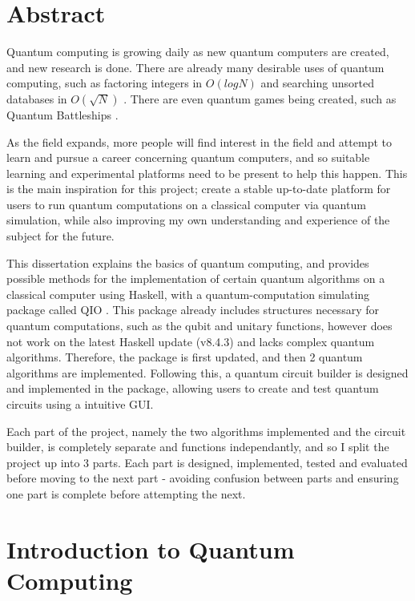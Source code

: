 \documentclass[a4paper,11pt, titlepage, twoside]{article}
\begin{document}
\section*{Abstract}
Quantum computing is growing daily as new quantum computers are created, and new research is done. There are already many desirable uses of quantum computing, such as factoring integers in $O(log N)$ \cite{shor} and searching unsorted databases in $O(\sqrt{N})$ \cite{grover}. There are even quantum games being created, such as Quantum Battleships \cite{qships}. \par
As the field expands, more people will find interest in the field and attempt to learn and pursue a career concerning quantum computers, and so suitable learning and experimental platforms need to be present to help this happen. This is the main inspiration for this project; create a stable up-to-date platform for users to run quantum computations on a classical computer via quantum simulation, while also improving my own understanding and experience of the subject for the future.\par
This dissertation explains the basics of quantum computing, and provides possible methods for the implementation of certain quantum algorithms on a classical computer using Haskell, with a quantum-computation simulating package called QIO \cite{qio}. This package already includes structures necessary for quantum computations, such as the qubit and unitary functions, however does not work on the latest Haskell update (v8.4.3) and lacks complex quantum algorithms. Therefore, the package is first updated, and then 2 quantum algorithms are implemented. Following this, a quantum circuit builder is designed and implemented in the package, allowing users to create and test quantum circuits using a intuitive GUI.\par
Each part of the project, namely the two algorithms implemented and the circuit builder, is completely separate and functions independantly, and so I split the project up into 3 parts. Each part is designed, implemented, tested and evaluated before moving to the next part - avoiding confusion between parts and ensuring one part is complete before attempting the next.
\newpage

\fancyhead[RE, LO]{\leftmark}
\tableofcontents
\clearpage
\fancyfoot[CE,CO]{\thepage}

\setcounter{page}{1}
\section{Introduction to Quantum Computing}
\end{document}
